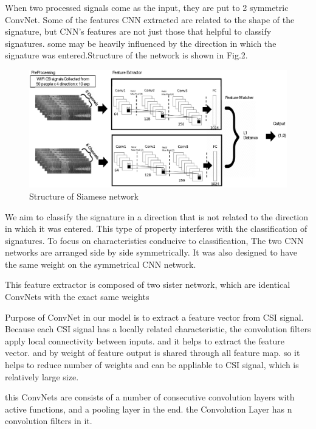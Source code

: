\documentclass[runningheads]{llncs}
\begin{document}
When two processed signals come as the input, they are put to 2 symmetric ConvNet. 
Some of the features CNN extracted are related to the shape of the signature, but CNN's features are not just those that helpful to classify signatures. some may be heavily influenced by the direction in which the signature was entered.Structure of the network is shown in Fig.2.
\begin{figure}
    \includegraphics[width=\textwidth]{network1.eps}
    \caption{Structure of Siamese network} \label{network1}
\end{figure}
We aim to classify the signature in a direction that is not related to the direction in which it was entered. This type of property interferes with the classification of signatures.
To focus on characteristics conducive to classification, The two CNN networks are arranged side by side symmetrically.
It was also designed to have the same weight on the symmetrical CNN network.


This feature extractor is composed of two sister network, which are identical ConvNets with the exact same weights

Purpose of ConvNet in our model is to extract a feature vector from CSI signal. 
Because each CSI signal has a locally related characteristic, the convolution filters apply local connectivity between inputs.
and it helps to extract the feature vector.
and by weight of feature output is shared through all feature map.
so it helps to reduce number of weights and can be appliable to CSI signal, which is relatively large size.


this ConvNets are consists of a number of consecutive convolution layers with active functions, and a pooling layer in the end.
the Convolution Layer has n convolution filters in it.
\end{document}
